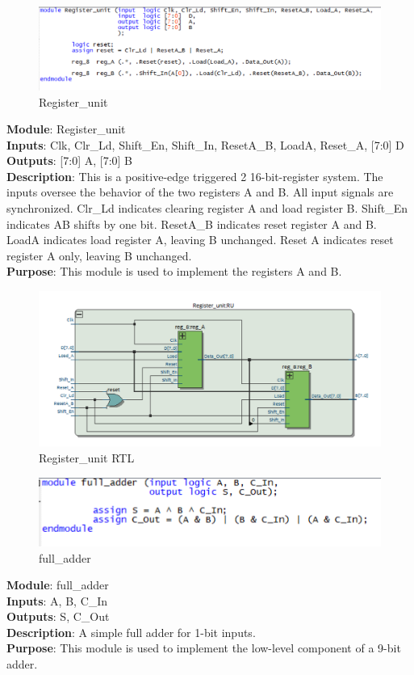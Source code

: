 \documentclass[12pt]{article}
\begin{document}
\begin{figure}[H]
    \centering
    \includegraphics[width=15cm]{regunit.png}
    \caption{Register\_unit}
\end{figure}
\textbf{Module}: Register\_unit \\ 
\textbf{Inputs}: Clk, Clr\_Ld, Shift\_En, Shift\_In, ResetA\_B, LoadA, Reset\_A, [7:0] D \\ 
\textbf{Outputs}: [7:0] A, [7:0] B \\ 
\textbf{Description}: This is a positive-edge triggered 2 16-bit-register system. The inputs oversee the behavior of the two registers A and B. All input signals are synchronized. Clr\_Ld indicates clearing register A and load register B. Shift\_En indicates AB shifts by one bit. ResetA\_B indicates reset register A and B. LoadA indicates load register A, leaving B unchanged. Reset A indicates reset register A only, leaving B unchanged. \\ 
\textbf{Purpose}: This module is used to implement the registers A and B. \\
\begin{figure}[H]
    \centering
    \includegraphics[width=15cm]{regunit_RTL.png}
    \caption{Register\_unit RTL}
\end{figure}

\begin{figure}[H]
    \centering
    \includegraphics[width=15cm]{fulladder.png}
    \caption{full\_adder}
\end{figure}
\textbf{Module}: full\_adder \\ 
\textbf{Inputs}: A, B, C\_In \\ 
\textbf{Outputs}: S, C\_Out \\ 
\textbf{Description}: A simple full adder for 1-bit inputs. \\ 
\textbf{Purpose}: This module is used to implement the low-level component of a 9-bit adder. \\
\end{document}

